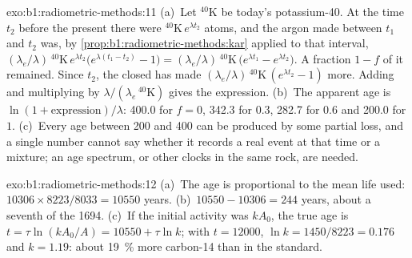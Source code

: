 \begin{solution}{exo:b1:radiometric-methods:11}
(a)~Let ${}^{40}\mathrm{K}$ be today's potassium-40. At the time $t_2$ before
the present there were ${}^{40}\mathrm{K}\,e^{\lambda t_2}$ atoms, and the argon
made between $t_1$ and $t_2$ was, by \cref{prop:b1:radiometric-methods:kar} applied
to that interval, $(\lambda_e/\lambda)\,{}^{40}\mathrm{K}\,e^{\lambda
t_2}\bigl(e^{\lambda (t_1 - t_2)} - 1\bigr) = (\lambda_e/\lambda)\,
{}^{40}\mathrm{K}\,\bigl(e^{\lambda t_1} - e^{\lambda t_2}\bigr)$. A fraction
$1 - f$ of it remained. Since $t_2$, the closed  has made
$(\lambda_e/\lambda)\,{}^{40}\mathrm{K}\,(e^{\lambda t_2} - 1)$ more. Adding and
multiplying by $\lambda/(\lambda_e\,{}^{40}\mathrm{K})$ gives the expression.
(b)~The apparent age is $\ln(1 + \text{expression})/\lambda$: \qty{400.0}{\Myr} for
$f = 0$, \qty{342.3}{\Myr} for $0.3$, \qty{282.7}{\Myr} for $0.6$ and
\qty{200.0}{\Myr} for $1$. (c)~Every age between \qty{200}{\Myr} and
\qty{400}{\Myr} can be produced by some partial loss, and a single number cannot
say whether it records a real event at that time or a mixture; an age spectrum,
or other clocks in the same rock, are needed.
\end{solution}

\begin{solution}{exo:b1:radiometric-methods:12}
(a)~The age is proportional to the mean life used: $10306 \times 8223/8033 =
\num{10550}$ years. (b)~$10550 - 10306 = 244$ years, about a seventh of the
\num{1694}. (c)~If the initial activity was $k A_0$, the true age is $t = \tau
\ln(k A_0/A) = \num{10550} + \tau \ln k$; with $t = \num{12000}$, $\ln k =
1450/8223 = 0.176$ and $k = 1.19$: about \qty{19}{\percent} more carbon-14 than
in the standard.
\end{solution}

